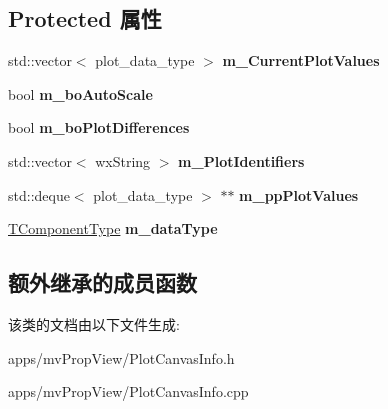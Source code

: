 \subsection*{Protected 属性}
\begin{DoxyCompactItemize}
\item 
\hypertarget{class_plot_canvas_info_base_aebaefe518c61e8c5f1040adaafabb6fa}{std\+::vector$<$ plot\+\_\+data\+\_\+type $>$ {\bfseries m\+\_\+\+Current\+Plot\+Values}}\label{class_plot_canvas_info_base_aebaefe518c61e8c5f1040adaafabb6fa}

\item 
\hypertarget{class_plot_canvas_info_base_ac47a8327fafff89b1d560f527285ed0f}{bool {\bfseries m\+\_\+bo\+Auto\+Scale}}\label{class_plot_canvas_info_base_ac47a8327fafff89b1d560f527285ed0f}

\item 
\hypertarget{class_plot_canvas_info_base_a20b1e8d65544f870aac901f155e96c2c}{bool {\bfseries m\+\_\+bo\+Plot\+Differences}}\label{class_plot_canvas_info_base_a20b1e8d65544f870aac901f155e96c2c}

\item 
\hypertarget{class_plot_canvas_info_base_a816a45b79637fbd072c8a6202b9bdfe2}{std\+::vector$<$ wx\+String $>$ {\bfseries m\+\_\+\+Plot\+Identifiers}}\label{class_plot_canvas_info_base_a816a45b79637fbd072c8a6202b9bdfe2}

\item 
\hypertarget{class_plot_canvas_info_base_a9039518f36bb412006748bfbf28889fd}{std\+::deque$<$ plot\+\_\+data\+\_\+type $>$ $\ast$$\ast$ {\bfseries m\+\_\+pp\+Plot\+Values}}\label{class_plot_canvas_info_base_a9039518f36bb412006748bfbf28889fd}

\item 
\hypertarget{class_plot_canvas_info_base_a3930f030b75ebbfac58f6f9ef7dcbed6}{\hyperlink{group___common_interface_ga7dbe9709a3bdae0b29581ff4f6fca3ff}{T\+Component\+Type} {\bfseries m\+\_\+data\+Type}}\label{class_plot_canvas_info_base_a3930f030b75ebbfac58f6f9ef7dcbed6}

\end{DoxyCompactItemize}
\subsection*{额外继承的成员函数}


该类的文档由以下文件生成\+:\begin{DoxyCompactItemize}
\item 
apps/mv\+Prop\+View/Plot\+Canvas\+Info.\+h\item 
apps/mv\+Prop\+View/Plot\+Canvas\+Info.\+cpp\end{DoxyCompactItemize}
